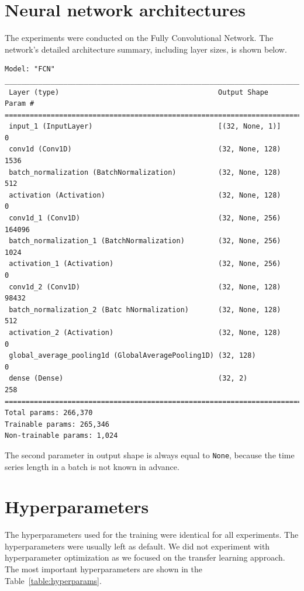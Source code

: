 \documentclass[a4paper,11pt,twoside]{report}
\theoremstyle{definition}
\begin{document}
\section{Neural network architectures}
The experiments were conducted on the Fully Convolutional Network. The network's detailed architecture summary, including layer sizes, is shown below. \begin{verbatim}
Model: "FCN"
_________________________________________________________________________________
 Layer (type)                                      Output Shape            Param #
=================================================================================
 input_1 (InputLayer)                              [(32, None, 1)]         0
 conv1d (Conv1D)                                   (32, None, 128)         1536
 batch_normalization (BatchNormalization)          (32, None, 128)         512
 activation (Activation)                           (32, None, 128)         0
 conv1d_1 (Conv1D)                                 (32, None, 256)         164096
 batch_normalization_1 (BatchNormalization)        (32, None, 256)         1024
 activation_1 (Activation)                         (32, None, 256)         0
 conv1d_2 (Conv1D)                                 (32, None, 128)         98432
 batch_normalization_2 (Batc hNormalization)       (32, None, 128)         512
 activation_2 (Activation)                         (32, None, 128)         0
 global_average_pooling1d (GlobalAveragePooling1D) (32, 128)               0
 dense (Dense)                                     (32, 2)                 258
=================================================================================
Total params: 266,370
Trainable params: 265,346
Non-trainable params: 1,024
\end{verbatim}
The second parameter in output shape is always equal to \texttt{None}, because the time series length in a batch is not known in advance.
\section{Hyperparameters}\label{section:hyperparameters}
The hyperparameters used for the training were identical for all experiments. The hyperparameters were usually left as default. We did not experiment with hyperparameter optimization as we focused on the transfer learning approach. The most important hyperparameters are shown in the Table~\ref{table:hyperparams}.

\FloatBarrier
\end{document}
